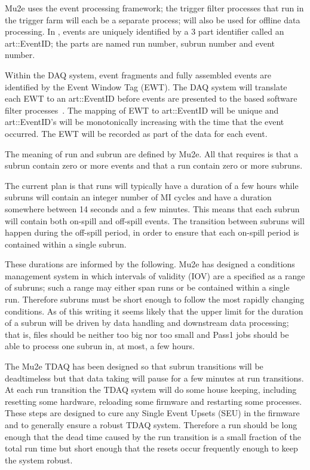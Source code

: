 Mu2e uses the \art event processing framework;
the trigger filter processes that run in the trigger farm will each be a separate \art process;
\art will also be used for offline data processing.
In \art, events are uniquely identified by a 3 part identifier called an
{\code art::EventID}; the parts are named run number, subrun number
and event number.

Within the DAQ system, event fragments and fully assembled events
are identified by the Event Window Tag (EWT).
The DAQ system will translate each EWT to an {\code art::EventID}
before events are presented to the \art based software filter processes~\cite{EventLabels}.
The mapping of EWT to  {\code art::EventID} will be unique and
{\code art::EventID}'s will be monotonically increasing with the time
that the event occurred.
The EWT will be recorded as part of the \art data for each event.

The meaning of run and subrun are defined by Mu2e.
All that \art requires is that a subrun contain zero or more
events and that a run contain zero or more subruns.

The current plan is that runs will typically have a duration of a few hours
while subruns will contain an integer number of MI cycles and
have a duration somewhere between 14 seconds and a few minutes.
This means that each subrun will contain both on-spill and
off-spill events.
The transition between subruns will happen during the off-spill period,
in order to ensure that each on-spill period is contained within a single subrun.

These durations are informed by the following.
Mu2e has designed a conditions management system
in which intervals of validity (IOV) are a specified as a range of subruns;
such a range may either span runs or be contained within a single run.
Therefore subruns must be short enough to follow the most
rapidly changing conditions.  As of this writing it seems
likely that the upper limit for the duration of a subrun will
be driven by data handling and downstream data processing;
that is, files should be neither too big nor too small
and  Pass1 jobs should be able to process one subrun
in, at most, a few hours.

The Mu2e TDAQ has been designed so that subrun transitions will be deadtimeless
but that data taking will pause for a few minutes at run transitions.
At each run transition the TDAQ system will do some house keeping,
including resetting some hardware, reloading some firmware and restarting some processes.
These steps are designed to cure any Single Event Upsets (SEU) in the firmware
and to generally ensure a robust TDAQ system.
Therefore a run should be long enough that the dead time
caused by the run transition is a small fraction of the total run time
but short enough that the resets occur frequently enough
to keep the system robust.

